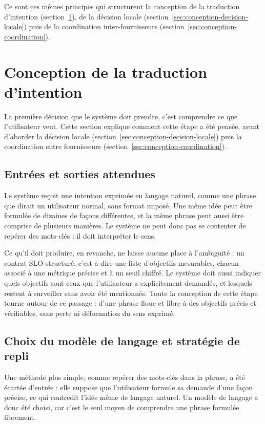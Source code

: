 Ce sont ces mêmes principes qui structurent la conception de la traduction d'intention (section~\ref{sec:conception-traduction}), de la décision locale (section~\ref{sec:conception-decision-locale}) puis de la coordination inter-fournisseurs (section~\ref{sec:conception-coordination}).
\section{Conception de la traduction d'intention}
\label{sec:conception-traduction}

La première décision que le système doit prendre, c'est comprendre ce que l'utilisateur veut. Cette section explique comment cette étape a été pensée, avant d'aborder la décision locale (section~\ref{sec:conception-decision-locale}) puis la coordination entre fournisseurs (section~\ref{sec:conception-coordination}).

\subsection{Entrées et sorties attendues}

Le système reçoit une intention exprimée en langage naturel, comme une phrase que dirait un utilisateur normal, sans format imposé. Une même idée peut être formulée de dizaines de façons différentes, et la même phrase peut aussi être comprise de plusieurs manières. Le système ne peut donc pas se contenter de repérer des mots-clés : il doit interpréter le sens.

Ce qu'il doit produire, en revanche, ne laisse aucune place à l'ambiguïté : un contrat SLO structuré, c'est-à-dire une liste d'objectifs mesurables, chacun associé à une métrique précise et à un seuil chiffré. Le système doit aussi indiquer quels objectifs sont ceux que l'utilisateur a explicitement demandés, et lesquels restent à surveiller sans avoir été mentionnés. Toute la conception de cette étape tourne autour de ce passage : d'une phrase floue et libre à des objectifs précis et vérifiables, sans perte ni déformation du sens exprimé.

\subsection{Choix du modèle de langage et stratégie de repli}

Une méthode plus simple, comme repérer des mots-clés dans la phrase, a été écartée d'entrée : elle suppose que l'utilisateur formule sa demande d'une façon précise, ce qui contredit l'idée même de langage naturel. Un modèle de langage a donc été choisi, car c'est le seul moyen de comprendre une phrase formulée librement.

